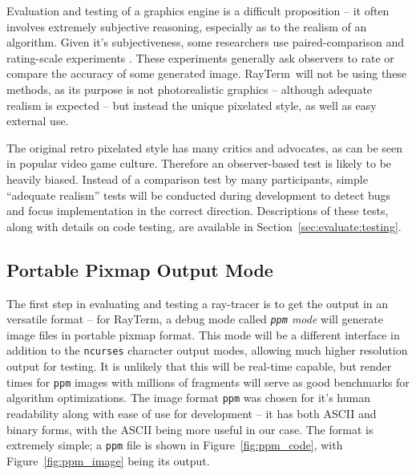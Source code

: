\documentclass[11pt]{article}
\newcommand{\name}{{\sc RayTerm}}
\begin{document}

Evaluation and testing of a graphics engine is a difficult proposition -- it often involves extremely subjective reasoning, especially as to the realism of an algorithm.
Given it's subjectiveness, some researchers use paired-comparison and rating-scale experiments \cite{kuang2007evaluating}.
These experiments generally ask observers to rate or compare the accuracy of some generated image.
\name\ will not be using these methods, as its purpose is not photorealistic graphics -- although adequate realism is expected -- but instead the unique pixelated style, as well as easy external use.

The original retro pixelated style has many critics and advocates, as can be seen in popular video game culture.
Therefore an observer-based test is likely to be heavily biased.
Instead of a comparison test by many participants, simple ``adequate realism'' tests will be conducted during development to detect bugs and focus implementation in the correct direction.
Descriptions of these tests, along with details on code testing, are available in Section~\ref{sec:evaluate:testing}.


\subsection{Portable Pixmap Output Mode}
\label{sec:evaluate:ppm_mode}

The first step in evaluating and testing a ray-tracer is to get the output in an versatile format -- for \name, a debug mode called {\it \texttt{ppm} mode} will generate image files in portable pixmap format.
This mode will be a different interface in addition to the \texttt{ncurses} character output modes, allowing much higher resolution output for testing.
It is unlikely that this will be real-time capable, but render times for \texttt{ppm} images with millions of fragments will serve as good benchmarks for algorithm optimizations.
The image format \texttt{ppm} was chosen for it's human readability along with ease of use for development -- it has both ASCII and binary forms, with the ASCII being more useful in our case.
The format is extremely simple; a \texttt{ppm} file is shown in Figure~\ref{fig:ppm_code}, with Figure~\ref{fig:ppm_image} being its output.
\end{document}
